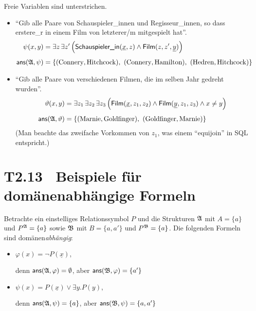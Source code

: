\documentclass[fontsize=11pt, twoside=false, numbers=autoenddot]{scrbook}
\begin{document}
Freie Variablen sind unterstrichen.
\begin{itemize}
  \item
    "`Gib alle Paare von Schauspieler\_innen und Regisseur\_innen,
    so dass erstere\_r in einem Film von letzterer/m mitgespielt hat"'.
    \begin{align*}
      \psi(x,y)               & = \exists z\,\exists z'\,\Big(\textsf{Schauspieler\_in}(\underline{x},z) \land \textsf{Film}(z,z',\underline{y})\Big) \\[4pt]
      \textsf{ans}(\mathfrak{A},\psi) & = \{(\text{Connery},\text{Hitchcock}),~(\text{Connery},\text{Hamilton}),~(\text{Hedren},\text{Hitchcock})\}
    \end{align*}
  \item
    "`Gib alle Paare von verschiedenen Filmen,
    die im selben Jahr gedreht wurden"'.
    \begin{align*}
      \vartheta(x,y)               & = \exists z_1\,\exists z_2\,\exists z_3\,\Big(\textsf{Film}(\underline{x},z_1,z_2) \land \textsf{Film}(\underline{y},z_1,z_3) \land x \neq y\Big) \\[4pt]
      \textsf{ans}(\mathfrak{A},\vartheta) & = \{(\text{Marnie},\text{Goldfinger}),~(\text{Goldfinger},\text{Marnie})\}
    \end{align*}
    (Man beachte das zweifache Vorkommen von $z_1$, was einem "`equijoin"' in SQL entspricht.)
\end{itemize}

\section*{T2.13~ Beispiele für domänenabhängige Formeln}

Betrachte ein einstelliges Relationssymbol $P$
und die Strukturen $\mathfrak{A}$ mit $A=\{a\}$ und $P^\mathfrak{A} = \{a\}$
sowie $\mathfrak{B}$ mit $B=\{a,a'\}$ und $P^\mathfrak{B} = \{a\}$.
Die folgenden Formeln sind domänen\-\emph{abhängig}:
\begin{itemize}
  \item
    $\varphi(x) = \lnot P(\underline{x})$,
    \par
    denn $\textsf{ans}(\mathfrak{A},\varphi) = \emptyset$,
    aber $\textsf{ans}(\mathfrak{B},\varphi) = \{a'\}$
    \par\smallskip
  \item
    $\psi(x) = P(\underline{x}) \lor \exists y.P(y)$,
    \par
    denn $\textsf{ans}(\mathfrak{A},\psi) = \{a\}$,
    aber $\textsf{ans}(\mathfrak{B},\psi) = \{a,a'\}$
\end{itemize}
\end{document}
